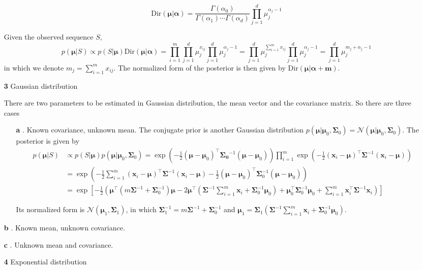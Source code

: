 \documentclass{article}
\begin{document}
\begin{itemize}
	\begin{equation*}
	\mathrm{Dir} (\bm{\mu}|\bm{\alpha}) = \frac{\Gamma(\alpha_0)}{\Gamma(\alpha_1)\cdots\Gamma(\alpha_d)}  \prod_{j=1}^d \mu_j^{\alpha_j-1}
	\end{equation*}
	
	Given the observed sequence $S$, 
	\begin{equation*}
	p(\bm{\mu}|S) \propto p(S|\bm{\mu}) \mathrm{Dir} (\bm{\mu}|\bm{\alpha}) =\prod_{i=1}^m \prod_{j=1}^d \mu_j^{x_{ij}} \prod_{j=1}^d \mu_j^{\alpha_j-1} = \prod_{j=1}^d \mu_j^{\sum_{i=1}^m x_{ij}} \prod_{j=1}^d \mu_j^{\alpha_j-1} =  \prod_{j=1}^d \mu_j^{m_j+\alpha_j-1}
	\end{equation*}
in which we denote $m_j=\sum_{i=1}^m x_{ij}$. The normalized form of the posterior is then given by $\mathrm{Dir}(\bm{\mu}|\bm{\alpha}+\bm{m})$.
	
	\item [\textbf{3}] Gaussian distribution

	There are two parameters to be estimated in Gaussian distribution, the mean vector and the covariance matrix. So there are three cases
	
	\begin{itemize}
	\item [\textbf{a}]. Known covariance, unknown mean.
	The conjugate prior is another Gaussian distribution $p(\bm{\mu}|\bm{\mu}_0, \bm{\Sigma}_0)=\mathcal{N}(\bm{\mu}|\bm{\mu}_0, \bm{\Sigma}_0)$. The posterior is given by
	\begin{equation*}
	\begin{split}
	p(\bm{\mu}|S) &\propto p(S|\bm{\mu})p(\bm{\mu}|\bm{\mu}_0, \bm{\Sigma}_0) =  \exp \left( -\frac{1}{2} (\bm{\mu}-\bm{\mu}_0)^\top \bm{\Sigma_0}^{-1} (\bm{\mu}-\bm{\mu}_0)\right) \prod_{i=1}^m \exp \left( -\frac{1}{2} (\bm{x}_i-\bm{\mu})^\top \bm{\Sigma}^{-1}  (\bm{x}_i-\bm{\mu}) \right) \\
	&= \exp \left( -\frac{1}{2} \sum_{i=1}^m  (\bm{x}_i-\bm{\mu})^\top \bm{\Sigma}^{-1}  (\bm{x}_i-\bm{\mu}) -\frac{1}{2}(\bm{\mu}-\bm{\mu}_0)^\top \bm{\Sigma}_0^{-1} (\bm{\mu}-\bm{\mu}_0) \right) \\
	&= \exp \left[ -\frac{1}{2} \left( \bm{\mu}^\top (m\bm{\Sigma}^{-1} + \bm{\Sigma}_0^{-1}) \bm{\mu} - 2 \bm{\mu}^\top \left(\bm{\Sigma}^{-1} \sum_{i=1}^m \bm{x}_i + \bm{\Sigma}_0^{-1} \bm{\mu}_0\right) + \bm{\mu}_0^\top \bm{\Sigma}_0^{-1} \bm{\mu}_0 + \sum_{i=1}^m \bm{x}_i^\top \bm{\Sigma}^{-1} \bm{x}_i\right) \right]
	\end{split}
	\end{equation*}
	
	Its normalized form is $\mathcal{N}(\bm{\mu}_1,\bm{\Sigma}_1)$, in which $\bm{\Sigma}_1^{-1}=m\bm{\Sigma}^{-1} + \bm{\Sigma}_0^{-1}$ and $\bm{\mu}_1=\bm{\Sigma}_1(\bm{\Sigma}^{-1} \sum_{i=1}^m \bm{x}_i + \bm{\Sigma}_0^{-1} \bm{\mu}_0)$.
	\end{itemize}		
	
	\item [\textbf{b}]. Known mean, unknown covariance.
	\item [\textbf{c}]. Unknown mean and covariance.
	\item [\textbf{4}] Exponential distribution
	\end{itemize}
	
\end{document}

